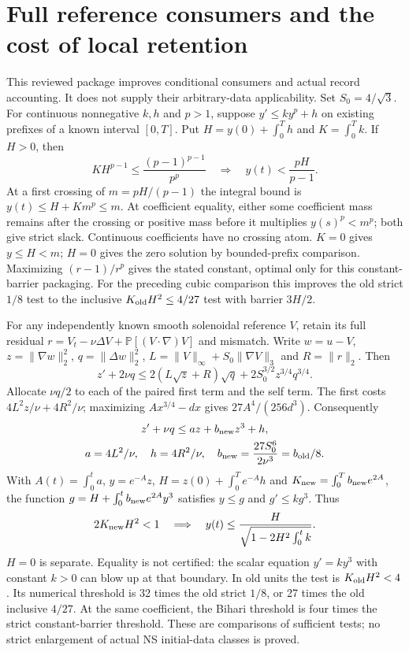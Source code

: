 \documentclass[11pt]{article}
\begin{document}
\section{Full reference consumers and the cost of local retention}
\label{sec:charged-reference-retention}
This reviewed package improves conditional consumers and actual record
accounting. It does not supply their arbitrary-data applicability.
Set $S_0=4/\sqrt3$. For continuous nonnegative $k,h$ and $p>1$, suppose
$y'\le ky^p+h$ on existing prefixes of a known interval $[0,T]$.
Put $H=y(0)+\int_0^T h$ and $K=\int_0^T k$. If $H>0$, then
\[
 KH^{p-1}\le\frac{(p-1)^{p-1}}{p^p}
 \quad\Longrightarrow\quad y(t)<\frac{pH}{p-1}.
\]
At a first crossing of $m=pH/(p-1)$ the integral bound is
$y(t)\le H+Km^p\le m$. At coefficient equality, either some coefficient
mass remains after the crossing or positive mass before it multiplies
$y(s)^p<m^p$; both give strict slack. Continuous coefficients have no
crossing atom. $K=0$ gives $y\le H<m$; $H=0$ gives the zero solution by
bounded-prefix comparison. Maximizing $(r-1)/r^p$ gives the stated
constant, optimal only for this constant-barrier packaging. For the
preceding cubic comparison this improves the old strict $1/8$ test to
the inclusive $K_{\rm old}H^2\le4/27$ test with barrier $3H/2$.

For any independently known smooth solenoidal reference $V$, retain its
full residual $r=V_t-\nu\Delta V+\mathbb P[(V\cdot\nabla)V]$ and mismatch.
Write $w=u-V$, $z=\|\nabla w\|_2^2$, $q=\|\Delta w\|_2^2$,
$L=\|V\|_\infty+S_0\|\nabla V\|_3$ and $R=\|r\|_2$. Then
\[
 z'+2\nu q\le2(L\sqrt z+R)\sqrt q+2S_0^{3/2}z^{3/4}q^{3/4}.
\]
Allocate $\nu q/2$ to each of the paired first term and the self term.
The first costs $4L^2z/\nu+4R^2/\nu$; maximizing $Ax^{3/4}-dx$ gives
$27A^4/(256d^3)$. Consequently
\[
 \begin{gathered}
 z'+\nu q\le az+b_{\rm new}z^3+h,\\
 a=4L^2/\nu,\quad h=4R^2/\nu,\quad
 b_{\rm new}=\frac{27S_0^6}{2\nu^3}=b_{\rm old}/8.
 \end{gathered}
\]
With $A(t)=\int_0^t a$, $y=e^{-A}z$,
$H=z(0)+\int_0^T e^{-A}h$ and $K_{\rm new}=\int_0^T b_{\rm new}e^{2A}$,
the function $g=H+\int_0^t b_{\rm new}e^{2A}y^3$ satisfies
$y\le g$ and $g'\le kg^3$. Thus
\[
 2K_{\rm new}H^2<1
 \quad\Longrightarrow\quad
 y(t)\le\frac{H}{\sqrt{1-2H^2\int_0^t k}}.
\]
$H=0$ is separate. Equality is not certified: the scalar equation
$y'=ky^3$ with constant $k>0$ can blow up at that boundary.
In old units the test is $K_{\rm old}H^2<4$. Its numerical threshold
is 32 times the old strict $1/8$, or 27 times the old inclusive $4/27$.
At the same coefficient, the Bihari threshold is four times the strict
constant-barrier threshold. These are comparisons of sufficient tests;
no strict enlargement of actual NS initial-data classes is proved.
\end{document}
